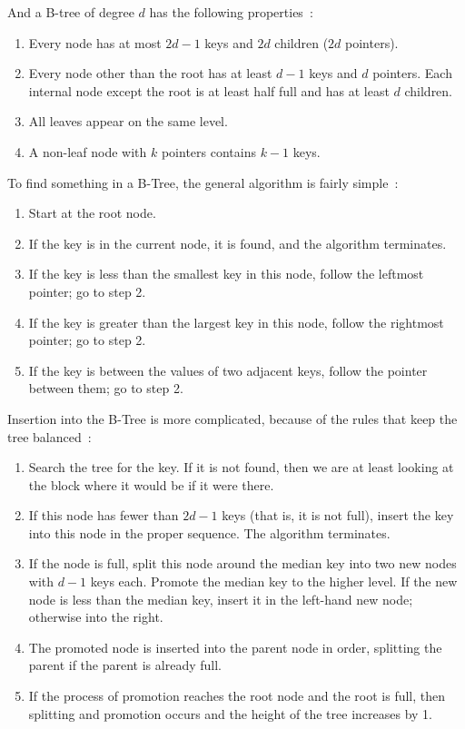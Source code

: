 And a B-tree of degree $d$ has the following properties~\cite{osi}:

\begin{enumerate}
	\item Every node has at most $2d-1$ keys and $2d$ children ($2d$ pointers).
	\item Every node other than the root has at least $d-1$ keys and $d$ pointers. Each internal node except the root is at least half full and has at least $d$ children.
	\item All leaves appear on the same level.
	\item A non-leaf node with $k$ pointers contains $k-1$ keys.
\end{enumerate}

To find something in a B-Tree, the general algorithm is fairly simple~\cite{osi}:

\begin{enumerate}
	\item Start at the root node. 
	\item If the key is in the current node, it is found, and the algorithm terminates.
	\item If the key is less than the smallest key in this node, follow the leftmost pointer; go to step 2.
	\item If the key is greater than the largest key in this node, follow the rightmost pointer; go to step 2.
	\item If the key is between the values of two adjacent keys, follow the pointer between them; go to step 2.
\end{enumerate}


Insertion into the B-Tree is more complicated, because of the rules that keep the tree balanced~\cite{osi}:

\begin{enumerate}
	\item Search the tree for the key. If it is not found, then we are at least looking at the block where it would be if it were there.
	\item If this node has fewer than $2d-1$ keys (that is, it is not full), insert the key into this node in the proper sequence. The algorithm terminates.
	\item If the node is full, split this node around the median key into two new nodes with $d-1$ keys each. Promote the median key to the higher level. If the new node is less than the median key, insert it in the left-hand new node; otherwise into the right.
	\item The promoted node is inserted into the parent node in order, splitting the parent if the parent is already full.
	\item If the process of promotion reaches the root node and the root is full, then splitting and promotion occurs and the height of the tree increases by 1.
\end{enumerate}

